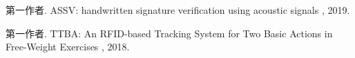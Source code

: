
\begin{publications}{99}
    \item\textsc{第一作者}. {ASSV: handwritten signature verification using acoustic signals
}, 2019.
    \item\textsc{第一作者}. {TTBA: An RFID-based Tracking System for Two Basic Actions in Free-Weight Exercises
}, 2018.
\end{publications}
